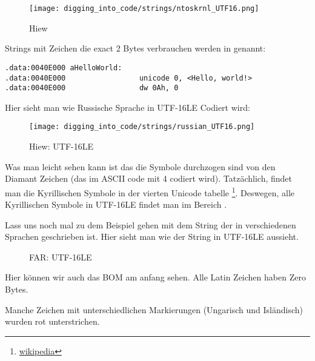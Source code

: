 \begin{figure}[H]
\centering
\texttt{[image: digging\_into\_code/strings/ntoskrnl\_UTF16.png]}
\caption{Hiew}
\end{figure}

Strings mit Zeichen die exact 2 Bytes verbrauchen werden  in \IDA genannt:

\begin{lstlisting}[style=customasmx86]
.data:0040E000 aHelloWorld:
.data:0040E000                 unicode 0, <Hello, world!>
.data:0040E000                 dw 0Ah, 0
\end{lstlisting}

Hier sieht man wie Russische Sprache in UTF-16LE Codiert wird:

\begin{figure}[H]
\centering
\texttt{[image: digging\_into\_code/strings/russian\_UTF16.png]}
\caption{Hiew: UTF-16LE}
\end{figure}

Was man leicht sehen kann ist das die Symbole durchzogen sind von den Diamant Zeichen (das im ASCII code mit 4 codiert wird).
Tatzächlich, findet man die Kyrillischen Symbole in der vierten Unicode tabelle 
\footnote{\href{http://go.yurichev.com/17003}{wikipedia}}.
Deswegen, alle Kyrillischen Symbole in UTF-16LE findet man im Bereich .

Lass uns noch mal zu dem Beispiel gehen mit dem String der in verschiedenen Sprachen geschrieben ist.
Hier sieht man wie der String in UTF-16LE aussieht. 

\begin{figure}[H]
\centering
{}
\caption{FAR: UTF-16LE}
\end{figure}

Hier können wir auch das \ac{BOM} am anfang sehen. 
Alle Latin Zeichen haben Zero Bytes. %

Manche Zeichen mit unterschiedlichen Markierungen (Ungarisch und Isländisch) wurden rot unterstrichen.



